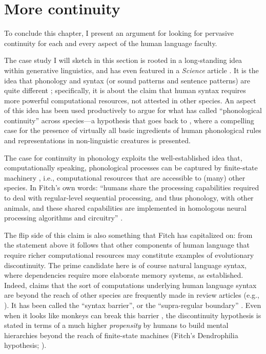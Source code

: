\section{More continuity}

To conclude this chapter, I present an argument for looking for pervasive continuity for each and every aspect of the human language faculty.

The case study I will sketch in this section is rooted in a long-standing idea within generative linguistics, and has even featured in a \textit{Science} article \citep{heinz2011sentence}. It is the idea that phonology and syntax (or sound patterns and sentence patterns) are quite different \citep{bromberger1989phonology}; specifically, it is about the claim that human syntax requires more powerful computational resources, not attested in other species. An aspect of this idea has been used productively to argue for what \cite{fitch2018animals} has called ``phonological continuity'' across species---a hypothesis that goes back to  \cite{samuels2011phonological,samuels2015can}, where a compelling case for the presence of virtually all basic ingredients of human phonological rules and representations in non-linguistic creatures is presented.

The case for continuity in phonology exploits the well-established idea that, computationally speaking, phonological processes can be captured by finite-state machinery \citep{karttunen1993finite}, i.e.,
computational resources that are accessible to (many) other species. In Fitch's own words: ``humans share the processing capabilities required to deal with regular-level sequential processing, and thus phonology, with other animals, and these shared capabilities are implemented in homologous neural processing algorithms and circuitry'' \citep{fitch2018animals}.

The flip side of this claim is also something that Fitch has capitalized on: from the statement above it follows that other components of human language that require richer computational resources may constitute examples of evolutionary discontinuity. The prime candidate here is of course natural language syntax, where dependencies require more elaborate memory systems, as \cite{chomsky1956three,Chomsky1957} established.
Indeed, claims that the sort of computations underlying human language syntax are beyond the reach of other species are frequently made in review articles (e.g., \cite{berwick2011songs}). It has been called the ``syntax barrier'', or the ``supra-regular boundary'' \citep{fitch2014toward,fitch2018bio}. Even when it looks like monkeys can break this barrier \citep{jiang2018production}, the discontinuity hypothesis is stated in terms of a much higher \textit{propensity} by humans to build mental hierarchies beyond the reach of finite-state machines (Fitch's Dendrophilia hypothesis; \cite{fitch2014toward,fitch2018bio}).

